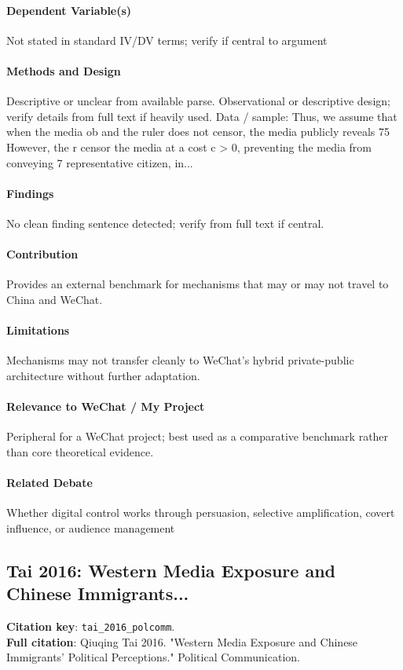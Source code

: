 \documentclass[12pt]{article}
\begin{document}
\paragraph{Dependent Variable(s)} Not stated in standard IV/DV terms; verify if central to argument

\paragraph{Methods and Design} Descriptive or unclear from available parse. Observational or descriptive design; verify details from full text if heavily used. Data / sample: Thus, we assume that when the media ob and the ruler does not censor, the media publicly reveals 75 However, the r censor the media at a cost c > 0, preventing the media from conveying 7 representative citizen, in...

\paragraph{Findings} No clean finding sentence detected; verify from full text if central.

\paragraph{Contribution} Provides an external benchmark for mechanisms that may or may not travel to China and WeChat.

\paragraph{Limitations} Mechanisms may not transfer cleanly to WeChat's hybrid private-public architecture without further adaptation.

\paragraph{Relevance to WeChat / My Project} Peripheral for a WeChat project; best used as a comparative benchmark rather than core theoretical evidence.

\paragraph{Related Debate} Whether digital control works through persuasion, selective amplification, covert influence, or audience management


\subsection{Tai 2016: Western Media Exposure and Chinese Immigrants...}
\textbf{Citation key}: \texttt{tai\_2016\_polcomm}.\\
\textbf{Full citation}: Qiuqing Tai 2016. "Western Media Exposure and Chinese Immigrants' Political Perceptions." Political Communication.
\end{document}
